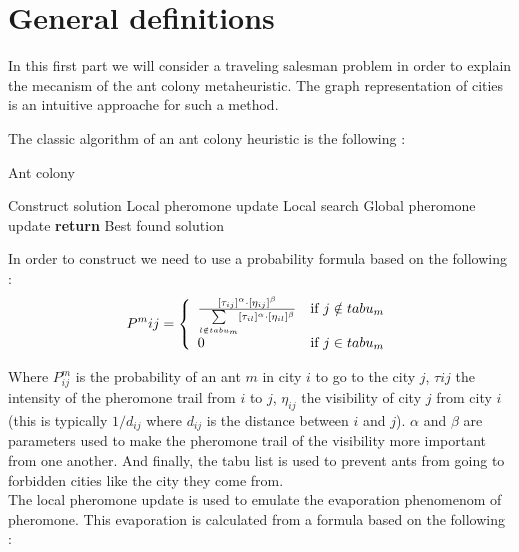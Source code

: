 \documentclass[UTF8, twoside]{EPURapport}
\begin{document}
\section{General definitions}

 	\hspace{4ex}In this first part we will consider a traveling salesman problem in order to explain the mecanism of the ant colony metaheuristic. The graph representation of cities is an intuitive approache for such a method.
	
	
	The classic algorithm of an ant colony heuristic is the following :

\begin{algorithm}
  \caption{Ant colony}
  \begin{algorithmic}[1]
        	\State Construct solution
			\State Local pheromone update
        \EndFor
        \State Local search
        \State Global pheromone update
      \EndFor
      \State \textbf{return} Best found solution
  \end{algorithmic}
\end{algorithm}

	In order to construct we need to use a probability formula based on the following :
	\\

\[
P^m_{}ij= \left\{ 
\begin{array}{l r}
\frac{[\tau_{ij}]^\alpha \cdot [\eta_{ij}]^\beta}{\underset{l\notin tabu_m}{\sum}[\tau_{il}]^\alpha \cdot [\eta_{il}]^\beta} & \text{if } j\notin tabu_m\\
0 & \text{if } j\in tabu_m
\end{array}
\right.
\]

	Where $P^m_{ij}$ is the probability of an ant $m$ in city $i$ to go to the city $j$, $\tau{ij}$ the intensity of the pheromone trail from $i$ to $j$, $\eta_{ij}$  the visibility of city $j$ from city $i$ (this is typically $1/d_{ij}$ where $d_{ij}$ is the distance between $i$ and $j$). $\alpha$ and $\beta$ are parameters used to make the pheromone trail of the visibility more important from one another. And finally, the tabu list is used to prevent ants from going to forbidden cities like the city they come from.
\\

	The local pheromone update is used to emulate the evaporation phenomenom of pheromone. This evaporation is calculated from a formula based on the following :
	\\
	
\end{document}

